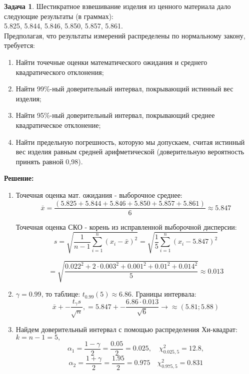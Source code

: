 \documentclass[a4paper,11pt]{article}
\newenvironment{shdd}{\begin{mdframed}[backgroundcolor=shadecolor]}{\end{mdframed}}
\theoremstyle{definition}
\newtheorem{problem}{Задача}\setlength{\parindent}{0pt}
\newenvironment{solution}
{\begin{shdd}\textbf{Решение:}\par\setlength{\parindent}{0pt}}
{\end{shdd}}
\begin{document}
\vspace{10pt}
\begin{problem}
    Шестикратное взвешивание изделия из ценного материала дало следующие результаты
    (в граммах): 
    \\ 5.825, 5.844, 5.846, 5.850, 5.857, 5.861. 
    \\ Предполагая, что результаты измерений распределены по нормальному закону, требуется:
    \begin{enumerate}
        \item Найти точечные оценки математического ожидания и среднего квадратического отклонения;
        \item Найти 99\%-ный доверительный интервал, покрывающий истинный вес изделия; 
        \item Найти 95\%-ный доверительный интервал, покрывающий среднее квадратическое отклонение; 
        \item Найти предельную погрешность, которую мы допускаем, считая истинный вес изделия равным
        средней арифметической (доверительную вероятность принять равной 0,98).
    \end{enumerate} 
    \begin{solution}
        \begin{enumerate}
            \item Точечная оценка мат. ожидания - выборочное среднее: 
                \[
                \bar{x} = \frac{(5.825+5.844+5.846+5.850+5.857+5.861)}{6}\approx5.847
                \]
                
                Точечная оценка СКО - корень из исправленной выборочной дисперсии:
                \[
                s = \sqrt{\frac{1}{n-1}\sum^n_{i=1}(x_i - \bar{x})^2} 
                = \sqrt{\frac{1}{5}\sum^n_{i=1}(x_i - 5.847)^2}
                \]
                
                \[
                = \sqrt{\frac{0.022^2+2\cdot0.003^2+0.001^2+0.01^2+0.014^2}{5}} \approx 0.013
                \]

            \item 
                \(\gamma = 0.99\), то таблице: \(t_{0.99}(5) \approx 6.86\).
                \newline Границы интервала: 
                    \[ \bar{x} +- \frac{t_{\gamma}s}{\sqrt{n}}, = 5.847 +- \frac{6.86\cdot0.013}{\sqrt{6}} \rightarrow \approx (5.81; 5.88)\]
            \item Найдем доверительный интервал с помощью распределения Хи-квадрат:
                \newline \(k=n-1=5,\)
                \newline \[\alpha_1 = \frac{1-\gamma}{2} = \frac{0.05}{2} = 0.025, \quad \chi^2_{0.025, 5} = 12.8,\]
                \newline \[
                         \alpha_2 = \frac{1+\gamma}{2} = \frac{1.95}{2} = 0.975 \quad \chi^2_{0.975, 5} = 0.831
                         \] 


\end{enumerate}
\end{solution}
\end{problem}
\end{document}
